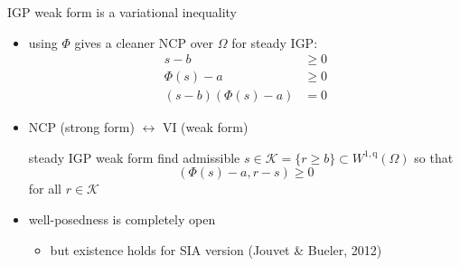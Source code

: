 \documentclass[usepdftitle=false]{beamer}
\newcommand{\ip}[2]{\left(#1,#2\right)}
\newcommand{\qq}{{\text{q}}}
\begin{document}
\begin{frame}{IGP weak form is a variational inequality}

\begin{itemize}
\item using $\Phi$ gives a cleaner NCP over $\Omega$ for steady IGP:
\begin{align*}
s - b &\ge 0 \\
\Phi(s) - a &\ge 0 \\
(s - b) (\Phi(s) - a) &= 0
\end{align*}

\item NCP (strong form) $\leftrightarrow$ VI (weak form)

\begin{block}{steady IGP weak form}
find admissible $s \in \mathcal{K} = \{r \ge b\} \subset W^{1,\qq}(\Omega)$ so that
    $$\ip{\Phi(s)-a}{r-s} \ge 0$$
for all $r \in \mathcal{K}$
\end{block}

\item well-posedness is completely open
    \begin{itemize}
    \item but existence holds for SIA version (Jouvet \& Bueler, 2012)
    \end{itemize}

\end{itemize}
\end{frame}
\end{document}

